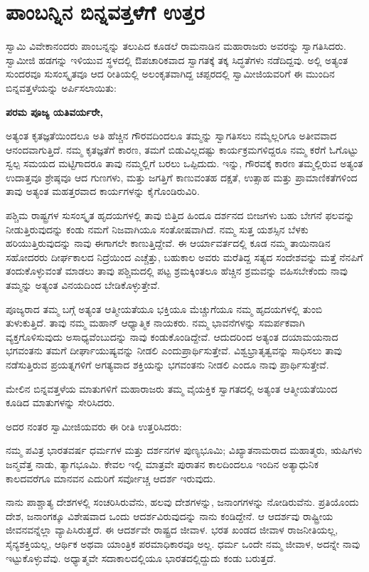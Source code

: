 
\chapter{ಪಾಂಬನ್ನಿನ ಬಿನ್ನವತ್ತಳೆಗೆ ಉತ್ತರ}

ಸ್ವಾಮಿ ವಿವೇಕಾನಂದರು ಪಾಂಬನ್ನನ್ನು ತಲುಪಿದ ಕೂಡಲೆ ರಾಮನಾಡಿನ ಮಹಾರಾಜರು ಅವರನ್ನು ಸ್ವಾಗತಿಸಿದರು. ಸ್ವಾಮೀಜಿ ಹಡಗನ್ನು ಇಳಿಯುವ ಸ್ಥಳದಲ್ಲಿ ಔಪಚಾರಿಕವಾದ ಸ್ವಾಗತಕ್ಕೆ ತಕ್ಕ ಸಿದ್ಧತೆಗಳು ನಡೆದಿದ್ದವು. ಅಲ್ಲಿ ಅತ್ಯಂತ ಸುಂದರವೂ ಸುಸಂಸ್ಕೃತವೂ ಆದ ರೀತಿಯಲ್ಲಿ ಅಲಂಕೃತವಾಗಿದ್ದ ಚಪ್ಪರದಲ್ಲಿ ಸ್ವಾಮೀಜಿಯವರಿಗೆ ಈ ಮುಂದಿನ ಬಿನ್ನವತ್ತಳೆಯನ್ನು ಅರ್ಪಿಸಲಾಯಿತು:

\textbf{ಪರಮ ಪೂಜ್ಯ ಯತಿವರ್ಯರೇ, }

ಅತ್ಯಂತ ಕೃತಜ್ಞತೆಯಿಂದಲೂ ಅತಿ ಹೆಚ್ಚಿನ ಗೌರವದಿಂದಲೂ ತಮ್ಮನ್ನು ಸ್ವಾಗತಿಸಲು ನಮ್ಮೆಲ್ಲರಿಗೂ ಅತೀವವಾದ ಆನಂದವಾಗುತ್ತಿದೆ. ನಮ್ಮ ಕೃತಜ್ಞತೆಗೆ ಕಾರಣ, ತಮಗೆ ಬಿಡುವಿಲ್ಲದಷ್ಟು ಕಾರ್ಯಕ್ರಮಗಳಿದ್ದರೂ ನಮ್ಮ ಕರೆಗೆ ಓಗೊಟ್ಟು ಸ್ವಲ್ಪ ಸಮಯದ ಮಟ್ಟಿಗಾದರೂ ತಾವು ನಮ್ಮಲ್ಲಿಗೆ ಬರಲು ಒಪ್ಪಿದುದು. ಇನ್ನು, ಗೌರವಕ್ಕೆ ಕಾರಣ ತಮ್ಮಲ್ಲಿರುವ ಅತ್ಯಂತ ಉದಾತ್ತವೂ ಶ್ರೇಷ್ಠವೂ ಆದ ಗುಣಗಳು, ಮತ್ತು ಜಗತ್ತಿಗೆ ಕಾಣುವಂತಹ ದಕ್ಷತೆ, ಉತ್ಸಾಹ ಮತ್ತು ಪ್ರಾಮಾಣಿಕತೆಗಳಿಂದ ತಾವು ಅತ್ಯಂತ ಮಹತ್ತರವಾದ ಕಾರ್ಯಗಳನ್ನು ಕೈಗೊಂಡಿರುವಿರಿ. 

ಪಶ್ಚಿಮ ರಾಷ್ಟ್ರಗಳ ಸುಸಂಸ್ಕೃತ ಹೃದಯಗಳಲ್ಲಿ ತಾವು ಬಿತ್ತಿದ ಹಿಂದೂ ದರ್ಶನದ ಬೀಜಗಳು ಬಹು ಬೇಗನೆ ಫಲವನ್ನು ನೀಡುತ್ತಿರುವುದನ್ನು ಕಂಡು ನಮಗೆ ನಿಜವಾಗಿಯೂ ಸಂತೋಷವಾಗಿದೆ. ನಮ್ಮ ಸುತ್ತ ಯಶಸ್ಸಿನ ಬೆಳಕು ಹರಿಯುತ್ತಿರುವುದನ್ನು ನಾವು ಈಗಾಗಲೇ ಕಾಣುತ್ತಿದ್ದೇವೆ. ಈ ಆರ್ಯಾವರ್ತದಲ್ಲಿ ಕೂಡ ನಮ್ಮ ತಾಯಿನಾಡಿನ ಸಹೋದರರು ದೀರ್ಘಕಾಲದ ನಿದ್ರೆಯಿಂದ ಎಚ್ಚೆತ್ತು, ಬಹುಕಾಲ ಅವರು ಮರೆತಿದ್ದ ಸತ್ಯದ ಸಂದೇಶವನ್ನು ಮತ್ತೆ ನೆನಪಿಗೆ ತಂದುಕೊಳ್ಳುವಂತೆ ಮಾಡಲು ತಾವು ಪಶ್ಚಿಮದಲ್ಲಿ ಪಟ್ಟ ಶ್ರಮಕ್ಕಿಂತಲೂ ಹೆಚ್ಚಿನ ಶ್ರಮವನ್ನು ವಹಿಸಬೇಕೆಂದು ನಾವು ತಮ್ಮನ್ನು ಅತ್ಯಂತ ವಿನಯದಿಂದ ಬೇಡಿಕೊಳ್ಳುತ್ತೇವೆ. 

ಪೂಜ್ಯರಾದ ತಮ್ಮ ಬಗ್ಗೆ ಅತ್ಯಂತ ಆತ್ಮೀಯತೆಯೂ ಭಕ್ತಿಯೂ ಮೆಚ್ಚುಗೆಯೂ ನಮ್ಮ ಹೃದಯಗಳಲ್ಲಿ ತುಂಬಿ ತುಳುಕುತ್ತಿದೆ. ತಾವು ನಮ್ಮ ಮಹಾನ್​ ಆಧ್ಯಾತ್ಮಿಕ ನಾಯಕರು. ನಮ್ಮ ಭಾವನೆಗಳನ್ನು ಸಮರ್ಪಕವಾಗಿ ವ್ಯಕ್ತಗೊಳಿಸುವುದು ಅಸಾಧ್ಯವೆಂಬುದನ್ನು ನಾವು ಕಂಡುಕೊಂಡಿದ್ದೇವೆ. ಆದುದರಿಂದ ಅತ್ಯಂತ ದಯಾಮಯನಾದ ಭಗವಂತನು ತಮಗೆ ದೀರ್ಘಾಯುಷ್ಯವನ್ನು ನೀಡಲಿ ಎಂದು\break ಪ್ರಾರ್ಥಿಸುತ್ತೇವೆ. ವಿಶ್ವಭ್ರಾತೃತ್ವವನ್ನು ಸಾಧಿಸಲು ತಾವು ನಡೆಸುತ್ತಿರುವ ಪ್ರಯತ್ನಗಳಿಗೆ ಅಗತ್ಯವಾದ ಶಕ್ತಿಯನ್ನು ಭಗವಂತನು ನೀಡಲಿ ಎಂದೂ ನಾವು ಪ್ರಾರ್ಥಿಸುತ್ತೇವೆ. 

ಮೇಲಿನ ಬಿನ್ನವತ್ತಳೆಯ ಮಾತುಗಳಿಗೆ ಮಹಾರಾಜರು ತಮ್ಮ ವೈಯಕ್ತಿಕ ಸ್ವಾಗತದಲ್ಲಿ ಅತ್ಯಂತ ಆತ್ಮೀಯತೆಯಿಂದ ಕೂಡಿದ ಮಾತುಗಳನ್ನು ಸೇರಿಸಿದರು. 

ಅದರ ನಂತರ ಸ್ವಾಮೀಜಿಯವರು ಈ ರೀತಿ ಉತ್ತರಿಸಿದರು:

ನಮ್ಮ ಪವಿತ್ರ ಭಾರತವರ್ಷ ಧರ್ಮಗಳ ಮತ್ತು ದರ್ಶನಗಳ ಪುಣ್ಯಭೂಮಿ; ವಿಖ್ಯಾತನಾಮರಾದ ಮಹಾತ್ಮರು, ಋಷಿಗಳು ಜನ್ಮವೆತ್ತ ನಾಡು, ತ್ಯಾಗಭೂಮಿ. ಕೇವಲ ಇಲ್ಲಿ ಮಾತ್ರವೇ ಪುರಾತನ ಕಾಲದಿಂದಲೂ ಇಂದಿನ ಅತ್ಯಾಧುನಿಕ ಕಾಲದವರೆಗೂ ಮಾನವನ ಎದುರಿಗೆ ಸರ್ವೋಚ್ಚ ಆದರ್ಶ ಇರುವುದು. 

ನಾನು ಪಾಶ್ಚಾತ್ಯ ದೇಶಗಳಲ್ಲಿ ಸಂಚರಿಸಿರುವೆನು, ಹಲವು ದೇಶಗಳನ್ನು, ಜನಾಂಗಗಳನ್ನು ನೋಡಿರುವೆನು. ಪ್ರತಿಯೊಂದು ದೇಶ, ಜನಾಂಗಕ್ಕೂ ವಿಶೇಷವಾದ ಒಂದು ಆದರ್ಶವಿರುವುದನ್ನು ನಾನು ಕಂಡಿದ್ದೇನೆ. ಆ ಆದರ್ಶವು ರಾಷ್ಟ್ರೀಯ ಜೀವನವನ್ನೆಲ್ಲಾ ವ್ಯಾಪಿಸಿರುತ್ತದೆ. ಈ ಆದರ್ಶವೇ ರಾಷ್ಟ್ರದ ಜೀವಾಳ. ಭರತ ಖಂಡದ ಜೀವಾಳ ರಾಜನೀತಿಯಲ್ಲ, ಸೈನ್ಯಶಕ್ತಿಯಲ್ಲ, ಆರ್ಥಿಕ ಅಥವಾ ಯಾಂತ್ರಿಕ ಪರಮಾಧಿಕಾರವೂ ಅಲ್ಲ. ಧರ್ಮ ಒಂದೇ ನಮ್ಮ ಜೀವಾಳ, ಅದನ್ನೇ ನಾವು ಇಟ್ಟುಕೊಳ್ಳುವೆವು. ಅಧ್ಯಾತ್ಮವೇ ಸದಾಕಾಲದಲ್ಲಿಯೂ ಭಾರತದಲ್ಲಿದ್ದುದು ಕಂಡು ಬರುತ್ತದೆ. 

